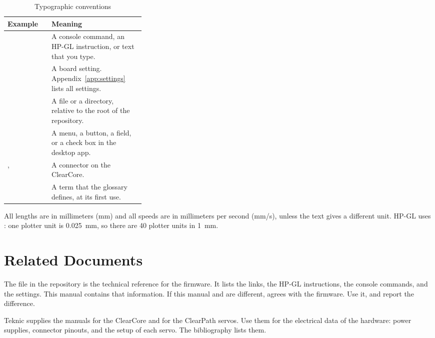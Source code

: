 \begin{table}[htbp]
\centering
\caption{Typographic conventions}\label{tab:typo}
\begin{tabularx}{\linewidth}{@{}P{0.32\linewidth}L@{}}
\toprule
\textbf{Example} & \textbf{Meaning} \\
\midrule
{} & A console command, an HP-GL instruction, or text that you type. \\
 & A board setting. Appendix~\ref{app:settings} lists all settings. \\
 & A file or a directory, relative to the root of the repository. \\
 & A menu, a button, a field, or a check box in the desktop app. \\
,  & A connector on the ClearCore. \\
 & A term that the glossary defines, at its first use. \\
\bottomrule
\end{tabularx}
\end{table}

All lengths are in millimeters (mm) and all speeds are in millimeters per
second (mm/s), unless the text gives a different unit. HP-GL uses
: one plotter unit is \SI{0.025}{mm}, so there are
40 plotter units in \SI{1}{mm}.

\section*{Related Documents}

The file  in the repository is the technical
reference for the firmware. It lists the links, the HP-GL instructions, the
console commands, and the settings. This manual contains that information.
If this manual and  are different, 
agrees with the firmware. Use it, and report the difference.

Teknic supplies the manuals for the ClearCore and for the ClearPath servos.
Use them for the electrical data of the hardware: power supplies,
connector pinouts, and the setup of each servo. The bibliography lists them.
